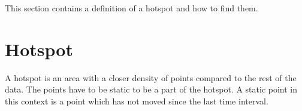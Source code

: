 This section contains a definition of a hotspot and how to find them.

\section{Hotspot}\label{hotspot}
A hotspot is an area with a closer density of points compared to the rest of the data.
The points have to be static to be a part of the hotspot.
A static point in this context is a point which has not moved since the last time interval.
